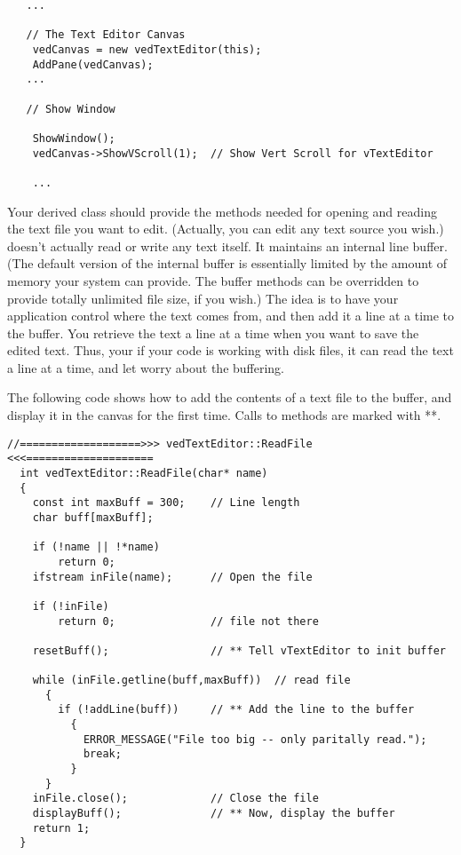 \footnotesize
\begin{verbatim}
   ...

   // The Text Editor Canvas
    vedCanvas = new vedTextEditor(this);
    AddPane(vedCanvas);
   ...

   // Show Window

    ShowWindow();
    vedCanvas->ShowVScroll(1);  // Show Vert Scroll for vTextEditor

    ...
\end{verbatim}
\normalfont\normalsize

Your derived  class should provide the methods
needed for opening and reading the text file you want to edit.
(Actually, you can edit any text source you wish.) 
doesn't actually read or write any text itself. It maintains an
internal line buffer. (The default version of the internal buffer
is essentially limited by the amount of memory your system can
provide. The buffer methods can be overridden to provide totally
unlimited file size, if you wish.) The idea is to have your
application control where the text comes from, and then
add it a line at a time to the  buffer.
You retrieve the text a line at a time when you want to save
the edited text. Thus, your if your code is working with
disk files, it can read the text a line at a time, and let
 worry about the buffering.

The following code shows how to add the contents of a text file
to the  buffer, and display it in the canvas
for the first time. Calls to  methods are
marked with **.

\footnotesize
\begin{verbatim}
//===================>>> vedTextEditor::ReadFile <<<====================
  int vedTextEditor::ReadFile(char* name)
  {
    const int maxBuff = 300;    // Line length
    char buff[maxBuff];

    if (!name || !*name)
        return 0;
    ifstream inFile(name);      // Open the file

    if (!inFile)
        return 0;               // file not there

    resetBuff();                // ** Tell vTextEditor to init buffer

    while (inFile.getline(buff,maxBuff))  // read file
      {
        if (!addLine(buff))     // ** Add the line to the buffer
          {
            ERROR_MESSAGE("File too big -- only paritally read.");
            break;
          }
      }
    inFile.close();             // Close the file
    displayBuff();              // ** Now, display the buffer
    return 1;
  }
\end{verbatim}
\normalfont\normalsize

